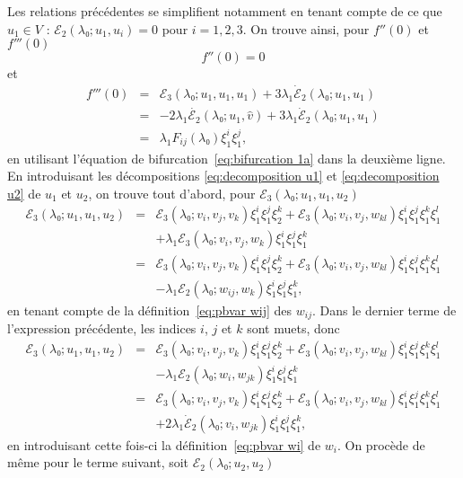 \documentclass{article}
\begin{document}
Les relations précédentes se simplifient notamment en tenant compte de
ce que $u_1∈V$ : $ℰ_2 (λ₀ ; u_1, u_i) = 0$ pour $i = 1,
2, 3$. On trouve ainsi, pour $f'' (0)$ et $f''' (0)$
\begin{equation}
  \label{eq:DL energie derivee 2nde} f'' (0) = 0
\end{equation}
et
\begin{eqnarray}
  f''' (0) & = & ℰ_3 (λ₀ ; u_1, u_1, u_1) + 3 λ_1
  \dot{ℰ}_2 (λ₀ ; u_1, u_1) \nonumber\\
  & = & - 2 λ_1  \dot{ℰ_2} (λ₀ ; u_1, \hat{v}) + 3
  λ_1  \dot{ℰ}_2 (λ₀ ; u_1, u_1) \nonumber\\
  & = & λ_1 F_{i  j} (λ₀) ξ_1^i ξ_1^j,  \label{eq:DL
  energie derivee 3ieme}
\end{eqnarray}
en utilisant l'équation de bifurcation~\eqref{eq:bifurcation 1a} dans la
deuxième ligne. En introduisant les décompositions
\eqref{eq:decomposition u1} et \eqref{eq:decomposition u2} de $u_1$ et $u_2$,
on trouve tout d'abord, pour $ℰ_3 (λ₀ ; u_1, u_1, u_2)$
\begin{eqnarray*}
  ℰ_3 (λ₀ ; u_1, u_1, u_2) & = & ℰ_3 (λ₀ ;
  v_i, v_j, v_k) ξ_1^i ξ_1^j ξ_2^k +ℰ_3 (λ₀ ; v_i, v_j,
  w_{k  l}) ξ_1^i ξ_1^j ξ_1^k ξ_1^l\\
  &  &  + λ_1 ℰ_3 (λ₀ ; v_i, v_j, w_k)
  ξ_1^i ξ_1^j ξ_1^k\\
  & = & ℰ_3 (λ₀ ; v_i, v_j, v_k) ξ_1^i ξ_1^j ξ_2^k
  +ℰ_3 (λ₀ ; v_i, v_j, w_{k  l}) ξ_1^i ξ_1^j
  ξ_1^k ξ_1^l\\
  &  &  - λ_1 ℰ_2 (λ₀ ; w_{i  j},
  w_k) ξ_1^i ξ_1^j ξ_1^k,
\end{eqnarray*}
en tenant compte de la définition~\eqref{eq:pbvar wij} des $w_{i
j}$. Dans le dernier terme de l'expression précédente, les indices
$i$, $j$ et $k$ sont muets, donc
\begin{eqnarray*}
  ℰ_3 (λ₀ ; u_1, u_1, u_2) & = & ℰ_3 (λ₀ ;
  v_i, v_j, v_k) ξ_1^i ξ_1^j ξ_2^k +ℰ_3 (λ₀ ; v_i, v_j,
  w_{k  l}) ξ_1^i ξ_1^j ξ_1^k ξ_1^l\\
  &  &  - λ_1 ℰ_2 (λ₀ ; w_{i }, w_{j
   k}) ξ_1^i ξ_1^j ξ_1^k\\
  & = & ℰ_3 (λ₀ ; v_i, v_j, v_k) ξ_1^i ξ_1^j ξ_2^k
  +ℰ_3 (λ₀ ; v_i, v_j, w_{k  l}) ξ_1^i ξ_1^j
  ξ_1^k ξ_1^l\\
  &  &  + 2 λ_1  \dot{ℰ}_2 (λ₀ ; v_{i
  }, w_{j  k}) ξ_1^i ξ_1^j ξ_1^k,
\end{eqnarray*}
en introduisant cette fois-ci la définition~\eqref{eq:pbvar wi} de $w_i .$
On procède de même pour le terme suivant, soit $ℰ_2
(λ₀ ; u_2, u_2)$
\end{document}
